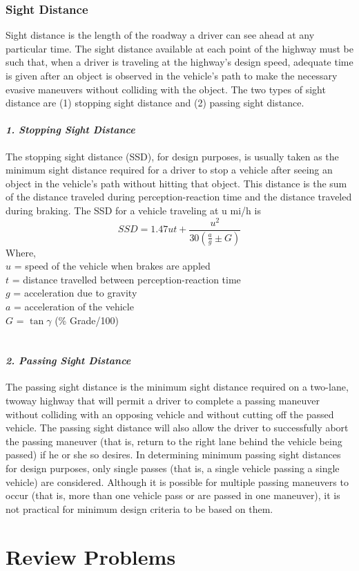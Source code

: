\subsubsection{Sight Distance}
Sight distance is the length of the roadway a driver can see ahead at any particular time. The sight distance available at each point of the highway must be such that, when a driver is traveling at the highway’s design speed, adequate time is given after an object is observed in the vehicle’s path to make the necessary evasive maneuvers without colliding with the object. The two types of sight distance are (1) stopping sight distance and (2) passing sight distance.
\paragraph{\emph{1. Stopping Sight Distance}}
The stopping sight distance (SSD), for design purposes, is usually taken as the minimum sight distance required for a driver to stop a vehicle after seeing an object in the vehicle’s path without hitting that object. This distance is the sum of the distance traveled during perception-reaction time and the distance traveled during braking. The SSD for a vehicle traveling at u mi/h is
\begin{equation}
	SSD = 1.47ut + \frac{u^2}{30\left(\frac{a}{g} \pm G \right)}
\end{equation}
Where,\\
\hspace*{10mm}$u$ = speed of the vehicle when brakes are appled\\
\hspace*{10mm}$t$ = distance travelled between perception-reaction time\\
\hspace*{10mm}$g$ = acceleration due to gravity\\
\hspace*{10mm}$a$ = acceleration of the vehicle\\
\hspace*{10mm}$G$ = $\tan \gamma$ (\% Grade/100)\\\\
\paragraph{\emph{2. Passing Sight Distance}}
The passing sight distance is the minimum sight distance required on a two-lane, twoway highway that will permit a driver to complete a passing maneuver without colliding with an opposing vehicle and without cutting off the passed vehicle. The passing sight distance will also allow the driver to successfully abort the passing maneuver (that is, return to the right lane behind the vehicle being passed) if he or she so desires. In determining minimum passing sight distances for design purposes, only single passes (that is, a single vehicle passing a single vehicle) are considered. Although it is possible for multiple passing maneuvers to occur (that is, more than one vehicle pass or are passed in one maneuver), it is not practical for minimum design criteria to be based on them.
\section{Review Problems}

